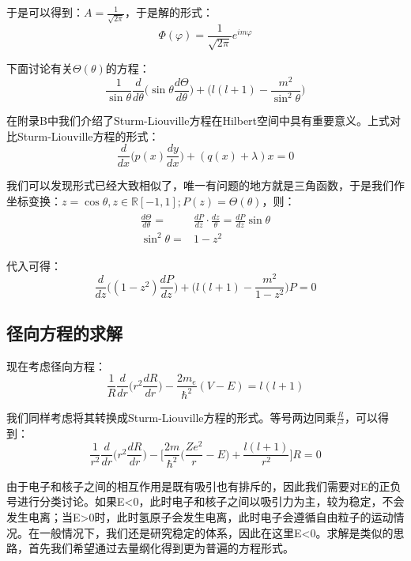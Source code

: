             于是可以得到：$A=\frac{1}{\sqrt{2\pi}}$，于是解的形式：
            \begin{equation}
                \Phi(\varphi)=\frac{1}{\sqrt{2\pi}}e^{im\varphi}
            \end{equation}
            
            下面讨论有关$\Theta(\theta)$的方程：
            \begin{equation}
                \frac{1}{\sin{\theta}}\frac{d}{d\theta}\Big(\sin{\theta}\frac{d\Theta}{d\theta}\Big)+\Big(l(l+1)-\frac {m^2}{\sin^2{\theta}}\Big)
            \end{equation}
            
            在附录B中我们介绍了Sturm-Liouville方程在Hilbert空间中具有重要意义。上式对比Sturm-Liouville方程的形式：
            \begin{equation}
                \frac{d}{dx}\Big(p(x)\frac{dy}{dx})+(q(x)+\lambda)x=0
            \end{equation}
            
            我们可以发现形式已经大致相似了，唯一有问题的地方就是三角函数，于是我们作坐标变换：$z=\cos{\theta},z\in \mathbb{R}[-1,1];P(z)=\Theta(\theta)$，则：
            \begin{align}
                \begin{split}
                    \frac{d\Theta}{d\theta}=&\frac{dP}{dz}\cdot \frac{dz}{\theta}=\frac{dP}{dz}\sin{\theta}\\
                    \sin^2{\theta}=&1-z^2
                \end{split}
            \end{align}
            
            代入可得：
            \begin{equation}
                \frac{d}{dz}\Big((1-z^2)\frac{dP}{dz}\Big)+\Big(l(l+1)-\frac{m^2}{1-z^2}\Big)P=0
            \end{equation}
        \subsection{径向方程的求解}
        
        现在考虑径向方程：
        \begin{equation}
            \frac{1}{R}\frac{d}{dr}\Big(r^2\frac{dR}{dr}\Big)-\frac{2m_e}{\hbar^2}(V-E)=l(l+1)
        \end{equation}
        
        我们同样考虑将其转换成Sturm-Liouville方程的形式。等号两边同乘$\frac{R}{r^2}$，可以得到：
        \begin{equation}
            \frac{1}{r^2}\frac{d}{dr}\Big(r^2\frac{dR}{dr}\Big)-\Big[\frac{2m}{\hbar^2}\Big(\frac{Ze^2}{r}-E\Big)+\frac{l(l+1)}{r^2}\Big]R=0
        \end{equation}
        
        由于电子和核子之间的相互作用是既有吸引也有排斥的，因此我们需要对E的正负号进行分类讨论。如果E<0，此时电子和核子之间以吸引力为主，较为稳定，不会发生电离；当E>0时，此时氢原子会发生电离，此时电子会遵循自由粒子的运动情况。在一般情况下，我们还是研究稳定的体系，因此在这里E<0。求解是类似的思路，首先我们希望通过去量纲化得到更为普遍的方程形式。